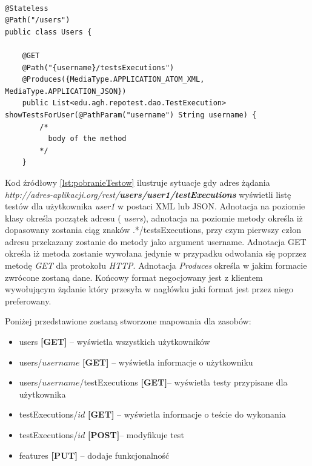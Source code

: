   
 \begin{lstlisting}[caption=Pobranie testów do wykonania dla użytkownika,label=lst:pobranieTestow]

@Stateless
@Path("/users")
public class Users {

    @GET
    @Path("{username}/testsExecutions")
    @Produces({MediaType.APPLICATION_ATOM_XML, MediaType.APPLICATION_JSON})
    public List<edu.agh.repotest.dao.TestExecution> showTestsForUser(@PathParam("username") String username) {
        /*
          body of the method
        */
    }

\end{lstlisting}
 
 Kod źródłowy \ref{lst:pobranieTestow} ilustruje sytuacje gdy adres żądania \textit{http://adres-aplikacji.org/rest/\textbf{users/user1/testExecutions}} wyświetli listę testów dla użytkownika \textit{user1} w postaci XML lub JSON. Adnotacja na poziomie klasy określa początek adresu ( \textit{users}), adnotacja na poziomie metody określa iż dopasowany zostania ciąg znaków .*/testsExecutions, przy czym pierwszy człon adresu przekazany zostanie do metody jako argument username. Adnotacja GET określa iż metoda zostanie wywołana jedynie w przypadku odwołania się poprzez metodę \textit{GET} dla protokołu \textit{HTTP}. Adnotacja \textit{Produces} określa w jakim formacie zwrócone zostaną dane. Końcowy format negocjowany jest z klientem wywołującym żądanie który przesyła w nagłówku jaki format jest przez niego preferowany.
 
Poniżej przedstawione zostaną stworzone mapowania dla zasobów:
\begin{itemize}
  \item users \textbf{[GET]} -- wyświetla wszystkich użytkowników
  \item users/{$username$} \textbf{[GET]} -- wyświetla informacje o użytkowniku
  \item users/{$username$}/testExecutions \textbf{[GET]}-- wyświetla testy przypisane dla użytkownika
  \item testExecutions/{$id$} \textbf{[GET]} -- wyświetla informacje o teście do wykonania
  \item testExecutions/{$id$} \textbf{[POST]}-- modyfikuje test
  \item features \textbf{[PUT]} -- dodaje funkcjonalność
  
\end{itemize}


